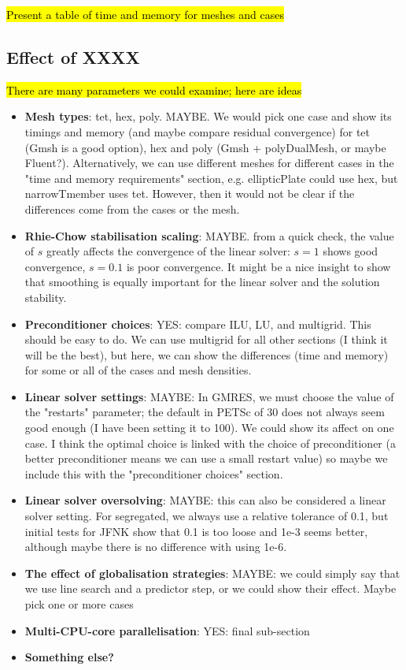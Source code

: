 \documentclass[sn-mathphys,Numbered]{sn-jnl}%
\begin{document}
\hl{Present a table of time and memory for meshes and cases}



\subsection{Effect of XXXX}

\hl{There are many parameters we could examine; here are ideas}
\begin{itemize}
	\item \textbf{Mesh types}: tet, hex, poly. MAYBE. We would pick one case and show its timings and memory (and maybe compare residual convergence) for tet (Gmsh is a good option), hex and poly (Gmsh + polyDualMesh, or maybe Fluent?).
	 Alternatively, we can use different meshes for different cases in the "time and memory requirements" section, e.g. ellipticPlate could use hex, but narrowTmember uses tet. However, then it would not be clear if the differences come from the cases or the mesh.
	\item \textbf{Rhie-Chow stabilisation scaling}: MAYBE. from a quick check, the value of $s$ greatly affects the convergence of the linear solver: $s=1$ shows good convergence, $s=0.1$ is poor convergence. It might be a nice insight to show that smoothing is equally important for the linear solver and the solution stability.
	\item \textbf{Preconditioner choices}: YES: compare ILU, LU, and multigrid. This should be easy to do. We can use multigrid for all other sections (I think it will be the best), but here, we can show the differences (time and memory) for some or all of the cases and mesh densities.
	\item \textbf{Linear solver settings}: MAYBE: In GMRES, we must choose the value of the "restarts" parameter; the default in PETSc of 30 does not always seem good enough (I have been setting it to 100). We could show its affect on one case. I think the optimal choice is linked with the choice of preconditioner (a better preconditioner means we can use a small restart value) so maybe we include this with the "preconditioner choices" section.
	\item \textbf{Linear solver oversolving}: MAYBE: this can also be considered a linear solver setting. For segregated, we always use a relative tolerance of 0.1, but initial tests for JFNK show that 0.1 is too loose and 1e-3 seems better, although maybe there is no difference with using 1e-6.
	\item \textbf{The effect of globalisation strategies}: MAYBE: we could simply say that we use line search and a predictor step, or we could show their effect. Maybe pick one or more cases
	\item \textbf{Multi-CPU-core parallelisation}: YES: final sub-section
	\item \textbf{Something else?}
\end{itemize}
\end{document}
